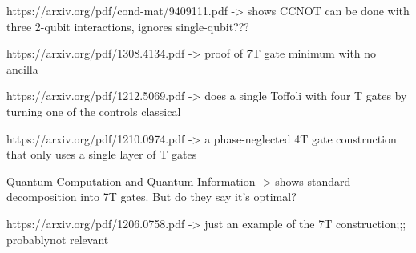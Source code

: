 \documentclass[twocolumn,longbibliography]{quantumarticle-customized}
\begin{document}
https://arxiv.org/pdf/cond-mat/9409111.pdf   -> shows CCNOT can be done with three 2-qubit interactions, ignores single-qubit???


https://arxiv.org/pdf/1308.4134.pdf -> proof of 7T gate minimum with no ancilla

https://arxiv.org/pdf/1212.5069.pdf  ->   does a single Toffoli with four T gates by turning one of the controls classical

https://arxiv.org/pdf/1210.0974.pdf  ->   a phase-neglected 4T gate construction that only uses a single layer of T gates


Quantum Computation and Quantum Information -> shows standard decomposition into 7T gates. But do they say it's optimal?

https://arxiv.org/pdf/1206.0758.pdf -> just an example of the 7T construction;;; probablynot relevant
\end{document}
